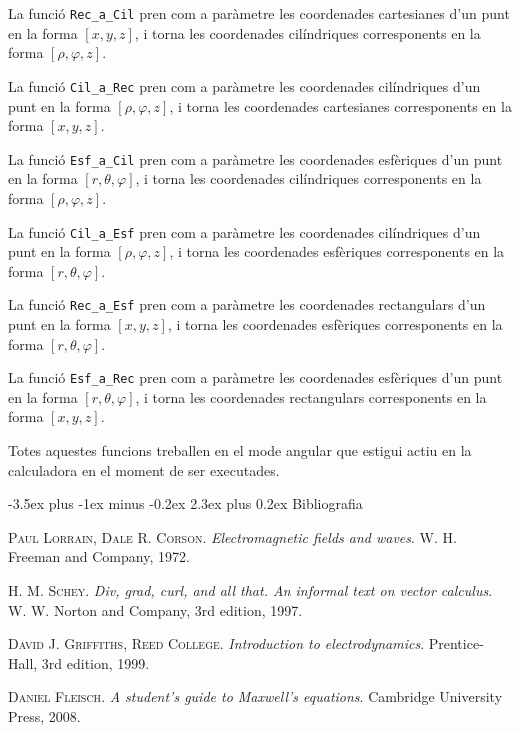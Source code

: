 \documentclass[catalan,a4paper,twoside,11pt]{article}
\makeatletter
\renewcommand{\section}{\@startsection {section}{1}{0pt}%
	{-3.5ex plus -1ex minus -0.2ex}%
	{2.3ex plus 0.2ex}%
	{\Large  \sffamily  \bfseries}}
\makeatother
\begin{document}
La funció \texttt{Rec\_a\_Cil} pren com a paràmetre les coordenades cartesianes d'un punt en la forma $[x,y,z]$, i torna les coordenades cilíndriques corresponents en la forma $[\rho,\varphi,z]$.



La funció \texttt{Cil\_a\_Rec} pren com a paràmetre les coordenades cilíndriques d'un punt en la forma $[\rho,\varphi,z]$, i torna les coordenades cartesianes corresponents en la forma  $[x,y,z]$.


La funció \texttt{Esf\_a\_Cil} pren com a paràmetre les coordenades esfèriques d'un punt en la forma $[r, \theta,\varphi]$, i torna les coordenades cilíndriques corresponents en la forma  $[\rho,\varphi,z]$.


La funció \texttt{Cil\_a\_Esf} pren com a paràmetre les coordenades cilíndriques  d'un punt en la forma $[\rho,\varphi,z]$, i torna les coordenades esfèriques corresponents en la forma $[r,\theta,\varphi]$.


La funció \texttt{Rec\_a\_Esf} pren com a paràmetre les coordenades rectangulars  d'un punt en la forma $[x,y,z]$, i torna les coordenades esfèriques corresponents en la forma $[r,\theta,\varphi]$.


La funció \texttt{Esf\_a\_Rec} pren com a paràmetre les coordenades esfèriques d'un punt en la forma $[r,\theta,\varphi]$, i torna les coordenades rectangulars corresponents en la forma $[x,y,z]$.



Totes aquestes funcions treballen en el mode angular que estigui actiu en la calculadora en el moment de ser executades.



\section{Bibliografia}

\textsc{Paul Lorrain, Dale R. Corson}. \textsl{Electromagnetic fields and waves}.  W. H. Freeman and Company, 1972.

\textsc{H. M. Schey}. \textsl{Div, grad, curl, and all that. An informal text on vector calculus}.  W. W. Norton and Company, 3rd edition, 1997.

\textsc{David J. Griffiths, Reed College}. \textsl{Introduction to electrodynamics}. Prentice-Hall, 3rd edition, 1999.

\textsc{Daniel Fleisch}. \textsl{A student's guide to Maxwell's equations}. Cambridge University Press, 2008.
\end{document}
